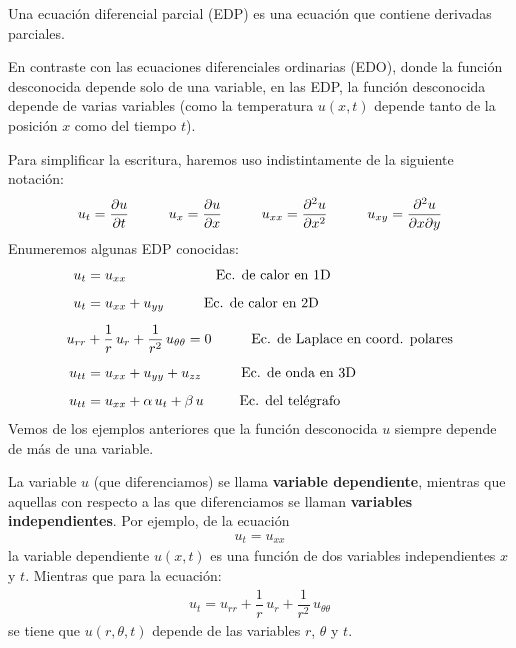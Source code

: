 \documentclass[12pt]{article}
\numberwithin{equation}{section}
\begin{document}
Una ecuación diferencial parcial (EDP) es una ecuación que contiene derivadas parciales.
\par
En contraste con las ecuaciones diferenciales ordinarias (EDO), donde la función desconocida depende solo de una variable, en las EDP, la función desconocida depende de varias variables (como la temperatura $u (x, t)$ depende tanto de la posición $x$ como del tiempo $t$).
\par
Para simplificar la escritura, haremos uso indistintamente de la siguiente notación:
\begin{align*}
u_{t} = \pdv{u}{t} \hspace{1cm} u_{x} = \pdv{u}{x} \hspace{1cm} u_{xx} = \pdv[2]{u}{x} \hspace{1cm} u_{xy} = \pdv[2]{u}{x}{y}
\end{align*}
Enumeremos algunas EDP conocidas:
\begin{align*}
u_{t} &= u_{xx} \hspace{2.25cm} \mbox{Ec. de calor en 1D} \\[0.5em]
u_{t} &= u_{xx} + u_{yy} \hspace{1cm} \mbox{Ec. de calor en 2D} \\[0.5em]
u_{rr} &+ \dfrac{1}{r} \, u_{r} + \dfrac{1}{r^{2}} \, u_{\theta \theta} = 0 \hspace{1cm} \mbox{Ec. de Laplace en coord. polares} \\[0.5em]
u_{tt} &= u_{xx} + u_{yy} + u_{zz} \hspace{1cm} \mbox{Ec. de onda en 3D} \\[0.5em]
u_{tt} &= u_{xx} + \alpha \, u_{t} + \beta \, u \hspace{0.9cm} \mbox{Ec. del telégrafo}
\end{align*}
Vemos de los ejemplos anteriores que la función desconocida $u$ siempre depende de más de una variable.
\par
La variable $u$ (que diferenciamos) se llama \textbf{variable dependiente},  mientras que aquellas con respecto a las que diferenciamos se llaman \textbf{variables independientes}. Por ejemplo, de la ecuación
\begin{align*}
u_{t} = u_{xx}
\end{align*}
la variable dependiente $u(x, t)$ es una función de dos variables independientes $x$ y $t$. Mientras que para la ecuación:
\begin{align*}
u_{t} = u_{rr} + \dfrac{1}{r} \, u_{r} + \dfrac{1}{r^{2}} \, u_{\theta \theta}
\end{align*}
se tiene que $u (r, \theta, t)$ depende de las variables $r$, $\theta$ y $t$.
\end{document}
